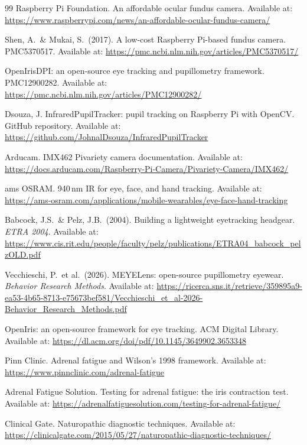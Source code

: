 \documentclass[11pt]{article}
\begin{document}
\begin{thebibliography}{99}
 Raspberry Pi Foundation. An affordable ocular fundus
  camera. Available at:
  \url{https://www.raspberrypi.com/news/an-affordable-ocular-fundus-camera/}

 Shen, A.\ \& Mukai, S.\ (2017). A low-cost Raspberry
  Pi-based fundus camera. PMC5370517. Available at:
  \url{https://pmc.ncbi.nlm.nih.gov/articles/PMC5370517/}

 OpenIrisDPI: an open-source eye tracking and
  pupillometry framework. PMC12900282. Available at:
  \url{https://pmc.ncbi.nlm.nih.gov/articles/PMC12900282/}

 Dsouza, J. InfraredPupilTracker: pupil tracking on
  Raspberry Pi with OpenCV. GitHub repository. Available at:
  \url{https://github.com/JohnalDsouza/InfraredPupilTracker}

 Arducam. IMX462 Pivariety camera documentation. Available
  at: \url{https://docs.arducam.com/Raspberry-Pi-Camera/Pivariety-Camera/IMX462/}

 ams OSRAM. 940\,nm IR for eye, face, and hand tracking.
  Available at:
  \url{https://ams-osram.com/applications/mobile-wearables/eye-face-hand-tracking}

 Babcock, J.S.\ \& Pelz, J.B.\ (2004). Building a
  lightweight eyetracking headgear. \textit{ETRA 2004}. Available at:
  \url{https://www.cis.rit.edu/people/faculty/pelz/publications/ETRA04_babcock_pelzOLD.pdf}

 Vecchieschi, P.\ et al.\ (2026). MEYELens: open-source
  pupillometry eyewear. \textit{Behavior Research Methods}. Available at:
  \url{https://ricerca.sns.it/retrieve/359895a9-ea53-4b65-8713-e75673bef581/Vecchieschi_et_al-2026-Behavior_Research_Methods.pdf}

 OpenIris: an open-source framework for eye tracking.
  ACM Digital Library. Available at:
  \url{https://dl.acm.org/doi/pdf/10.1145/3649902.3653348}

 Pinn Clinic. Adrenal fatigue and Wilson's 1998 framework.
  Available at: \url{https://www.pinnclinic.com/adrenal-fatigue}

 Adrenal Fatigue Solution. Testing for adrenal
  fatigue: the iris contraction test. Available at:
  \url{https://adrenalfatiguesolution.com/testing-for-adrenal-fatigue/}

 Clinical Gate. Naturopathic diagnostic techniques.
  Available at: \url{https://clinicalgate.com/2015/05/27/naturopathic-diagnostic-techniques/}


\end{thebibliography}
\end{document}
